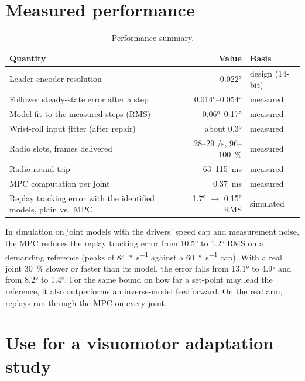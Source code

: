 \documentclass[11pt,a4paper]{article}
\newcommand{\status}[1]{\textsf{\small #1}}
\begin{document}
\section{Measured performance}
\label{sec:results}

\begin{table}[ht]
\centering\small
\begin{tabularx}{\linewidth}{@{}Lrl@{}}
\toprule
Quantity & Value & Basis \\
\midrule
Leader encoder resolution & \ang{0.022} & \status{design (14-bit)} \\
Follower steady-state error after a step & \ang{0.014}--\ang{0.054} & \status{measured} \\
Model fit to the measured steps (RMS) & \ang{0.06}--\ang{0.17} & \status{measured} \\
Wrist-roll input jitter (after repair) & about \ang{0.3} & \status{measured} \\
Radio slots, frames delivered & 28--29 /s, 96--\SI{100}{\percent} & \status{measured} \\
Radio round trip & 63--\SI{115}{\milli\second} & \status{measured} \\
MPC computation per joint & \SI{0.37}{\milli\second} & \status{measured} \\
Replay tracking error with the identified models, plain vs.\ MPC & \ang{1.7} $\to$ \ang{0.15} RMS &
   \status{simulated} \\
\bottomrule
\end{tabularx}
\caption{Performance summary.}
\label{tab:results}
\end{table}

In simulation on joint models with the drivers' speed cap and measurement noise, the MPC reduces the replay
tracking error from \ang{10.5} to \ang{1.2} RMS on a demanding reference (peaks of
\SI{84}{\degree\per\second} against a \SI{60}{\degree\per\second} cap). With a real joint \SI{30}{\percent}
slower or faster than its model, the error falls from \ang{13.1} to \ang{4.9} and from \ang{8.2} to \ang{1.4}.
For the same bound on how far a set-point may lead the reference, it also outperforms an inverse-model
feedforward. On the real arm, replays run through the MPC on every joint.

\section{Use for a visuomotor adaptation study}
\label{sec:study}
\end{document}
